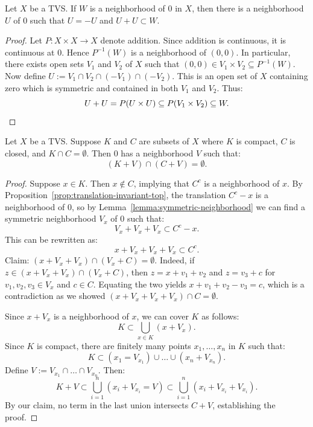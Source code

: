 \begin{lemma}\label{lemma:symmetric-neighborhood}
	Let $X$ be a TVS. If $W$ is a neighborhood of $0$ in $X$, then there is a neighborhood $U$ of $0$ such that $U = -U$ and $U + U \subset W$.
\end{lemma}
	\begin{proof}
		Let $P:X \times X \rightarrow X$ denote addition. Since addition is continuous, it is continuous at $0$. Hence $P^{-1}(W)$ is a neighborhood of $(0,0)$. In particular, there exists open sets $V_1$ and $V_2$ of $X$ such that $(0,0) \in V_1 \times V_2 \subseteq P^{-1}(W)$.  Now define $U := V_1 \cap V_2 \cap (-V_1) \cap (-V_2)$. This is an open set of $X$ containing zero which is symmetric and contained in both $V_1$ and $V_2$. Thus:
		\[
			U+U = P(U \times U) \subseteq P(V_1 \times V_2) \subseteq W. \qedhere
		\] 
	\end{proof}

\begin{lemma}\label{lemma:add-disjoint}
	Let $X$ be a TVS. Suppose $K$ and $C$ are subsets of $X$ where $K$ is compact, $C$ is closed, and $K \cap C = \emptyset$. Then $0$ has a neighborhood $V$ such that:
	\[
		(K + V) \cap (C+V) = \emptyset.
	\] 
\end{lemma}
	\begin{proof}
		Suppose $x \in K$. Then $x \not\in C$, implying that $C^c$ is a neighborhood of $x$. By Proposition~\ref{prop:translation-invariant-top}, the translation $C^c - x$ is a neighborhood of $0$, so by Lemma~\ref{lemma:symmetric-neighborhood} we can find a symmetric neighborhood $V_x$ of $0$ such that:
		\[
			V_x + V_x + V_x \subset C^c - x.
		\] 
		This can be rewritten as:
		\[
			x + V_x + V_x + V_x \subset C^c.
		\] 
		Claim: $(x+V_x + V_x) \cap (V_x + C) = \emptyset$. Indeed, if $z \in (x + V_x + V_x) \cap (V_x + C)$, then $z = x+v_1+v_2$ and $z = v_3 + c$ for $v_1,v_2,v_3 \in V_x$ and $c \in C$. Equating the two yields $x+v_1+v_2 - v_3 = c$, which is a contradiction as we showed $(x + V_x + V_x + V_x) \cap C = \emptyset$.

	Since $x + V_x$ is a neighborhood of $x$, we can cover $K$ as follows:
		\[
			K \subset \bigcup_{x \in K}(x +V_x).
		\]
		Since $K$ is compact, there are finitely many points $x_1,\ldots ,x_n$ in $K$ such that:
		\[
			K \subset (x_1 = V_{x_1}) \cup \ldots \cup (x_n + V_{x_n}).
		\]
		Define $V:= V_{x_1} \cap \ldots \cap V_{x_n}$. Then:
		\[
			K+V \subset \bigcup_{i = 1}^n (x_i + V_{x_i} = V) \subset \bigcup_{i = 1}^n (x_i + V_{x_i} + V_{x_i}).
		\] 
		By our claim, no term in the last union intersects $C+V$, establishing the proof.
	\end{proof}

